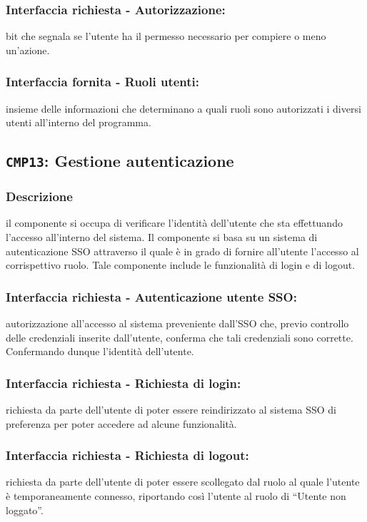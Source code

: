         \subsubsection{Interfaccia richiesta - Autorizzazione:}
            bit che segnala se l'utente ha il permesso necessario per compiere o meno un'azione.
        \subsubsection{Interfaccia fornita - Ruoli utenti:}
            insieme delle informazioni che determinano a quali ruoli sono autorizzati i diversi utenti all'interno del programma.

    \subsection{\texttt{CMP13}: Gestione autenticazione}
        \subsubsection{Descrizione}
            il componente si occupa di verificare l'identità dell'utente che sta effettuando l'accesso all'interno del sistema. Il componente si basa su un sistema di autenticazione SSO attraverso il quale è in grado di fornire all'utente l'accesso al corrispettivo ruolo. Tale componente include le funzionalità di login e di logout.
        \subsubsection{Interfaccia richiesta - Autenticazione utente SSO:}
            autorizzazione all'accesso al sistema preveniente dall'SSO che, previo controllo delle credenziali inserite dall'utente, conferma che tali credenziali sono corrette. Confermando dunque l'identità dell'utente.
        \subsubsection{Interfaccia richiesta - Richiesta di login:}
            richiesta da parte dell'utente di poter essere reindirizzato al sistema SSO di preferenza per poter accedere ad alcune funzionalità.
        \subsubsection{Interfaccia richiesta - Richiesta di logout:}
            richiesta da parte dell'utente di poter essere scollegato dal ruolo al quale l'utente è temporaneamente connesso, riportando così l'utente al ruolo di ``Utente non loggato''.
